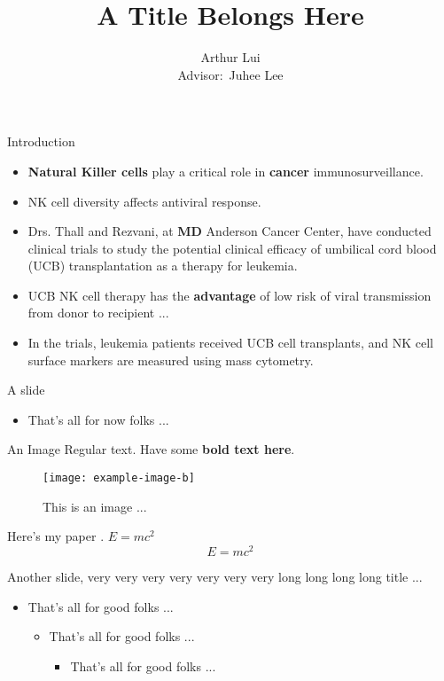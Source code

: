 \documentclass[]{beamer}  %
\title[short title]{A Title Belongs Here}
\author[A. Lui]{Arthur Lui \\ {\small Advisor$\colon$ Juhee Lee}}
\institute{Department of Statistics\\ UC Santa Cruz}
\begin{document}

\begin{frame}{Introduction}
  \begin{itemize}
    \setlength\itemsep{1em}

    \item
      \textbf{Natural Killer cells} play a critical role in \textbf{cancer} immunosurveillance.
    \item NK cell diversity affects antiviral response.
    \item Drs. Thall and Rezvani, at \textbf{MD} Anderson Cancer
      Center, have conducted clinical trials to study the potential clinical
      efficacy of umbilical cord blood (UCB) transplantation as a therapy for
      leukemia.
    \item UCB NK cell therapy has the \textbf{advantage} of low risk of viral
      transmission from donor to recipient ...
    \item In the trials, leukemia patients received UCB cell transplants, and
      NK cell surface markers are measured using mass cytometry.
  \end{itemize}
\end{frame}

\begin{frame}{A slide}
  \begin{itemize}
    \item That's all for now folks ...
  \end{itemize}
\end{frame}

\begin{frame}{An Image}
  Regular text.
  Have some \textbf{bold text here}.
  \begin{figure}
    \centering
    \texttt{[image: example-image-b]}
    \caption{This is an image ...}
  \end{figure}
  Here's my paper \citep{lui2020bayesian}.  $E = mc^2$
  $$ E = mc^2 $$
\end{frame}

\begin{frame}{Another slide, very very very very very very very 
  long long long long title ...}
  \begin{itemize}
    \item That's all for good folks ...
      \begin{itemize}
        \item That's all for good folks ...
          \begin{itemize}
            \item That's all for good folks ...
          \end{itemize}
      \end{itemize}
  \end{itemize}
\end{frame}
\end{document}
